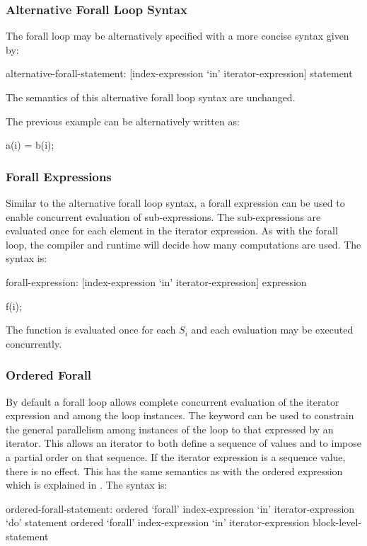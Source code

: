 \subsubsection{Alternative Forall Loop Syntax}
\label{Alternative_Forall_Loop_Syntax}

The forall loop may be alternatively specified with a more concise
syntax given by:
\begin{syntax}
alternative-forall-statement:
  [index-expression `in' iterator-expression] statement
\end{syntax}
The semantics of this alternative forall loop syntax are unchanged.

\begin{example}
The previous  example can be alternatively written as:
\begin{chapel}
[i in 1..N] a(i) = b(i);
\end{chapel}
\end{example}


\subsubsection{Forall Expressions} %
\label{Forall_Expressions}

Similar to the alternative forall loop syntax, a forall expression can
be used to enable concurrent evaluation of sub-expressions. The
sub-expressions are evaluated once for each element in the iterator
expression. As with the forall loop, the compiler and runtime will
decide how many computations are used. The syntax is:
\begin{syntax}
forall-expression:
   [index-expression `in' iterator-expression] expression
\end{syntax}

\begin{example}
\begin{chapel}
[i in S] f(i);
\end{chapel}
The function  is evaluated once for each $S_i$ and each evaluation
may be executed concurrently.
\end{example}


\subsubsection{Ordered Forall}
\label{Ordered_Forall}
By default a forall loop allows complete concurrent evaluation of the
iterator expression and among the loop instances. The
keyword  can be used to constrain the general
parallelism among instances of the loop to that expressed by an
iterator. This allows an iterator to both define a sequence of values
and to impose a partial order on that sequence. If the iterator
expression is a sequence value, there is no effect. This has the same
semantics as with the ordered expression which is explained
in .  The syntax is:
\begin{syntax}
ordered-forall-statement:
   ordered `forall' index-expression `in' iterator-expression `do' statement
   ordered `forall' index-expression `in' iterator-expression block-level-statement
\end{syntax}

